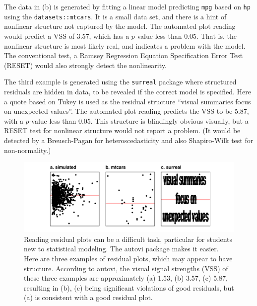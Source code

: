 \documentclass[
doublespace,
  times]{anzsauth}
\begin{document}
The data in (b) is generated by fitting a linear model predicting
\texttt{mpg} based on \texttt{hp} using the \texttt{datasets::mtcars}.
It is a small data set, and there is a hint of nonlinear structure not
captured by the model. The automated plot reading would predict a VSS of
3.57, which has a \(p\)-value less than 0.05. That is, the nonlinear
structure is most likely real, and indicates a problem with the model.
The conventional test, a Ramsey Regression Equation Specification Error
Test (RESET) \citep{ramsey1969tests} would also strongly detect the
nonlinearity.

The third example is generated using the \texttt{surreal} package
\citep{surreal} where structured residuals are hidden in data, to be
revealed if the correct model is specified. Here a quote based on Tukey
is used as the residual structure ``visual summaries focus on unexpected
values''. The automated plot reading predicts the VSS to be 5.87, with a
\(p\)-value less than 0.05. This structure is blindingly obvious
visually, but a RESET test for nonlinear structure would not report a
problem. (It would be detected by a Breusch-Pagan for heteroscedasticity
and also Shapiro-Wilk test \citep{shapiro1965analysis} for
non-normality.)

\begin{figure}[H]

{\centering \includegraphics[width=1\textwidth,height=\textheight]{autovi_paper_files/figure-pdf/three-examples-1.pdf}

}

\caption{Reading residual plots can be a difficult task, particular for
students new to statistical modeling. The autovi package makes it
easier. Here are three examples of residual plots, which may appear to
have structure. According to autovi, the visual signal strengths (VSS)
of these three examples are approximately (a) 1.53, (b) 3.57, (c) 5.87,
resulting in (b), (c) being significant violations of good residuals,
but (a) is consistent with a good residual plot.}

\end{figure}%
\end{document}
